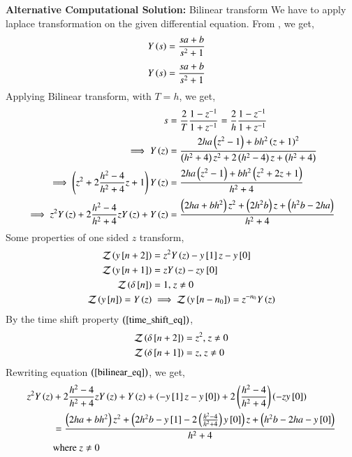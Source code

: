 \documentclass[journal]{IEEEtran}
\begin{document}
\textbf{Alternative Computational Solution:} Bilinear transform 
\newline
We have to apply laplace transformation on the given differential equation. From \brak{\ref{laplace_eq}}, we get,
\begin{align}
    Y\left(s\right) &= \frac{sa + b}{s^2 + 1}
\end{align}
\begin{align}
    Y\left(s\right) &= \frac{sa + b}{s^2 + 1}
\end{align}
Applying Bilinear transform, with $T = h$, we get,
\begin{align}
    s &= \frac{2}{T}\frac{1 - z^{-1}}{1 + z^{-1}} = \frac{2}{h}\frac{1 - z^{-1}}{1 + z^{-1}}\\
    \implies Y\left(z\right) &= \frac{2ha \left(z^2 - 1\right) + bh^2 \left(z + 1\right)^2}{\left(h^2 + 4\right)z^2 + 2\left(h^2 - 4\right)z + \left(h^2 + 4\right)}\\
    \implies \left(z^2 + 2\frac{h^2 - 4}{h^2 + 4}z + 1\right) Y\left(z\right) &= \frac{2ha \left(z^2 - 1\right) + bh^2 \left(z^2 + 2z + 1\right)}{h^2 + 4}\\
    \implies z^2Y\left(z\right) + 2\frac{h^2 - 4}{h^2 + 4}zY\left(z\right) + Y\left(z\right) &= \frac{\left(2h a + b h^2\right)z^2 + \left(2h^2 b\right)z + \left(h^2b - 2ha\right)}{h^2 + 4} \label{bilinear_eq}
\end{align}
Some properties of one sided $z$ transform,
\begin{align}
    \mathcal{Z}\brak{y\sbrak{n + 2}} &= z^2 Y\brak{z} - y\sbrak{1}z - y\sbrak{0}\\
    \mathcal{Z}\brak{y\sbrak{n + 1}} &= z Y\brak{z} - z y_\sbrak{0}\\
    \mathcal{Z}\brak{\delta\sbrak{n}} &= 1 \text{, } z \neq 0\\
    \mathcal{Z}\brak{y\sbrak{n}} = Y\brak{z} &\implies \mathcal{Z}\brak{y\sbrak{n - n_0}} = z^{-n_0}Y\brak{z} \label{time_shift_eq}
\end{align}
By the time shift property $\left(\ref{time_shift_eq}\right)$,
\begin{align}
    \mathcal{Z}\left(\delta{}\left[n + 2\right]\right) &= z^2 \text{, } z \neq 0\\
    \mathcal{Z}\left(\delta{}\left[n + 1\right]\right) &= z \text{, } z \neq 0
\end{align}
Rewriting equation $\left(\ref{bilinear_eq}\right)$, we get,
\begin{align}
    z^2Y\left(z\right) &+ 2\frac{h^2 - 4}{h^2 + 4}zY\left(z\right) + Y\left(z\right) + \left(- y{}\left[1\right]z - y{}\left[0\right]\right) + 2\left(\frac{h^2 - 4}{h^2 + 4}\right)\left(-zy{}\left[0\right]\right) \nonumber\\
    &= \frac{\left(2h a + b h^2\right)z^2 + \left(2h^2 b - y{}\left[1\right] - 2\left(\frac{h^2 - 4}{h^2 + 4}\right)y{}\left[0\right]\right)z + \left(h^2b - 2ha - y{}\left[0\right]\right)}{h^2 + 4} \label{z_trans_eq}\\
    &\text{where } z \neq 0
\end{align}
\end{document}
